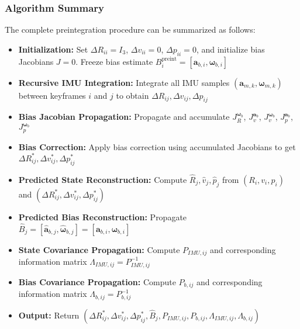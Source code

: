 \subsubsection{Algorithm Summary}
The complete preintegration procedure can be summarized as follows:
\begin{itemize}
    \item \textbf{Initialization:}  
    Set $\Delta R_{ii} = I_3$, $\Delta v_{ii} = 0$, $\Delta p_{ii} = 0$, and initialize bias Jacobians $J = 0$.  
    Freeze bias estimate $B_i^{\text{preint}} = [\mathbf{a}_{b,i}, \boldsymbol{\omega}_{b,i}]$

    \item \textbf{Recursive IMU Integration:}  
    Integrate all IMU samples $(\mathbf{a}_{m,k}, \boldsymbol{\omega}_{m,k})$ between keyframes $i$ and $j$ to obtain  
    $\Delta R_{ij}, \Delta v_{ij}, \Delta p_{ij}$

    \item \textbf{Bias Jacobian Propagation:}  
    Propagate and accumulate $J_R^{\boldsymbol{\omega}_b}$, $J_v^{\mathbf{a}_b}$, $J_v^{\boldsymbol{\omega}_b}$, $J_p^{\mathbf{a}_b}$, $J_p^{\boldsymbol{\omega}_b}$

    \item \textbf{Bias Correction:}  
    Apply bias correction using accumulated Jacobians to get  
    $\Delta R_{ij}^{*}, \Delta v_{ij}^{*}, \Delta p_{ij}^{*}$

    \item \textbf{Predicted State Reconstruction:}  
    Compute $\hat{R}_j, \hat{v}_j, \hat{p}_j$ from $(R_i, v_i, p_i)$ and $(\Delta R_{ij}^{*}, \Delta v_{ij}^{*}, \Delta p_{ij}^{*})$

    \item \textbf{Predicted Bias Reconstruction:}  
    Propagate $\hat{B}_j = [\hat{\mathbf{a}}_{b,j}, \hat{\boldsymbol{\omega}}_{b,j}] = [\mathbf{a}_{b,i}, \boldsymbol{\omega}_{b,i}]$

    \item \textbf{State Covariance Propagation:}  
    Compute $P_{IMU,ij}$ and corresponding information matrix $\Lambda_{IMU,ij} = P_{IMU,ij}^{-1}$

    \item \textbf{Bias Covariance Propagation:}  
    Compute $P_{b,ij}$ and corresponding information matrix $\Lambda_{b,ij} = P_{b,ij}^{-1}$

    \item \textbf{Output:}  
    Return $(\Delta R_{ij}^{*}, \Delta v_{ij}^{*}, \Delta p_{ij}^{*}, \hat{B}_j, P_{IMU,ij}, P_{b,ij}, \Lambda_{IMU,ij}, \Lambda_{b,ij})$
\end{itemize}
